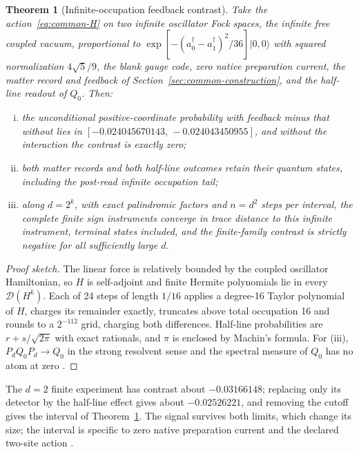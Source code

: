\documentclass[11pt]{article}
\newtheorem{theorem}{Theorem}[section]
\theoremstyle{definition}
\theoremstyle{remark}
\theoremstyle{plain}
\newcommand{\ket}[1]{\lvert #1\rangle}
\begin{document}
\begin{theorem}[Infinite-occupation feedback contrast]
\label{thm:infinite}
Take the action~\eqref{eq:common-H} on two infinite oscillator Fock spaces,
the infinite free coupled vacuum, proportional to
$\exp[-(a_0^\dagger-a_1^\dagger)^2/36]\ket{0,0}$ with squared normalization
$4\sqrt5/9$, the blank gauge code, zero native preparation current, the
matter record and feedback of Section~\ref{sec:common-construction}, and the
half-line readout of $Q_0$. Then:
\begin{enumerate}[(i)]
\item the unconditional positive-coordinate probability with feedback minus
that without lies in $[-0.024045670143,\,-0.024043450955]$, and without the
interaction the contrast is exactly zero;
\item both matter records and both half-line outcomes retain their quantum
states, including the post-read infinite occupation tail;
\item along $d=2^k$, with exact palindromic factors and $n=d^2$ steps per
interval, the complete finite sign instruments converge in trace distance to
this infinite instrument, terminal states included, and the finite-family
contrast is strictly negative for all sufficiently large $d$.
\end{enumerate}
\end{theorem}

\begin{proof}[Proof sketch]
The linear force is relatively bounded by the coupled oscillator Hamiltonian,
so $H$ is self-adjoint and finite Hermite polynomials lie in every
$\mathcal D(H^k)$. Each of 24 steps of length $1/16$ applies a degree-16
Taylor polynomial of $H$, charges its remainder exactly, truncates above total
occupation 16 and rounds to a $2^{-112}$ grid, charging both differences.
Half-line probabilities are $r+s/\sqrt{2\pi}$ with exact rationals, and $\pi$
is enclosed by Machin's formula. For (iii), $P_dQ_0P_d\to Q_0$ in the strong
resolvent sense and the spectral measure of $Q_0$ has no atom at zero
\cite{csINF,teschl2014,reedsimon1}.
\end{proof}

The $d=2$ finite experiment has contrast about $-0.03166148$; replacing only
its detector by the half-line effect gives about $-0.02526221$, and removing
the cutoff gives the interval of Theorem~\ref{thm:infinite}. The signal
survives both limits, which change its size; the interval is specific to zero
native preparation current and the declared two-site action \cite{csINF}.
\end{document}
